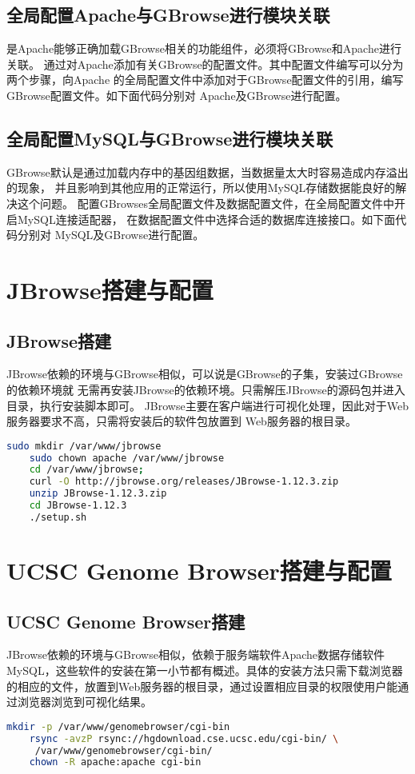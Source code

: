 	\subsection{全局配置Apache与GBrowse进行模块关联}
	是Apache能够正确加载GBrowse相关的功能组件，必须将GBrowse和Apache进行关联。
	通过对Apache添加有关GBrowse的配置文件。其中配置文件编写可以分为两个步骤，向Apache
	的全局配置文件中添加对于GBrowse配置文件的引用，编写GBrowse配置文件。如下面代码分别对
	Apache及GBrowse进行配置。
	\subsection{全局配置MySQL与GBrowse进行模块关联}
	GBrowse默认是通过加载内存中的基因组数据，当数据量太大时容易造成内存溢出的现象，
	并且影响到其他应用的正常运行，所以使用MySQL存储数据能良好的解决这个问题。
	配置GBrowses全局配置文件及数据配置文件，在全局配置文件中开启MySQL连接适配器，
	在数据配置文件中选择合适的数据库连接接口。如下面代码分别对
	MySQL及GBrowse进行配置。
	\section{JBrowse搭建与配置}
	\subsection{JBrowse搭建}
	JBrowse依赖的环境与GBrowse相似，可以说是GBrowse的子集，安装过GBrowse的依赖环境就
	无需再安装JBrowse的依赖环境。只需解压JBrowse的源码包并进入目录，执行安装脚本即可。
	JBrowse主要在客户端进行可视化处理，因此对于Web服务器要求不高，只需将安装后的软件包放置到
	Web服务器的根目录。
	\begin{lstlisting}[language=bash]
	sudo mkdir /var/www/jbrowse 
	sudo chown apache /var/www/jbrowse
	cd /var/www/jbrowse;
	curl -O http://jbrowse.org/releases/JBrowse-1.12.3.zip
	unzip JBrowse-1.12.3.zip
	cd JBrowse-1.12.3
	./setup.sh
	\end{lstlisting}
	
	\section{UCSC Genome Browser搭建与配置}
	\subsection{UCSC Genome Browser搭建}
	JBrowse依赖的环境与GBrowse相似，依赖于服务端软件Apache数据存储软件MySQL，这些软件的安装在第一小节都有概述。具体的安装方法只需下载浏览器的相应的文件，放置到Web服务器的根目录，通过设置相应目录的权限使用户能通过浏览器浏览到可视化结果。
	\begin{lstlisting}[language=bash]
	mkdir -p /var/www/genomebrowser/cgi-bin
	rsync -avzP rsync://hgdownload.cse.ucsc.edu/cgi-bin/ \
	 /var/www/genomebrowser/cgi-bin/
	chown -R apache:apache cgi-bin
	\end{lstlisting}
	